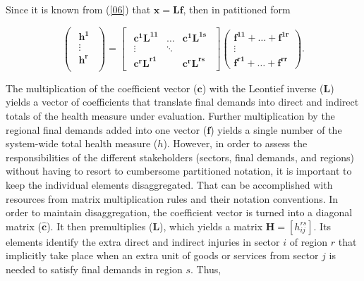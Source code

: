 \documentclass[a4paper,12pt, ]{article}
\begin{document}
\noindent Since it is known from (\ref{06}) that $\mathbf{x = Lf}$, then in patitioned form

\begin{equation} \begin{pmatrix} \begin{array}{c} \mathbf{h^1} \\ \vdots\\ \mathbf{h^r}\\ \end{array} \end{pmatrix} =
\begin{bmatrix} \begin{array}{ccc} \mathbf{c^1 L^{11}} & \ldots & \mathbf{c^1 L^{1s}} \\ \vdots &  \ddots &  \\ \mathbf{c^r L^{r1}}
&  & \mathbf{c^r L^{rs}} \end{array} \end{bmatrix} \left( \begin{array}{c} \mathbf{f^{11}} +  \ldots  +  \mathbf{f^{1r}} \\ \vdots 
\\ \mathbf{f^{r1}}  +  \ldots  +  \mathbf{f^{rr}} \end{array} \right). \label{09} 
\end{equation}

The multiplication of the coefficient vector ($\mathbf{c}$) with the Leontief inverse ($\mathbf{L}$) yields a vector of coefficients that translate final demands into direct and indirect totals of the health measure under evaluation. Further multiplication by the regional final demands added into one vector ($\mathbf{f}$) yields a single number of the system-wide total health measure ($h$). However, in order to assess the responsibilities of the different stakeholders (sectors, final demands, and regions) without having to resort to cumbersome partitioned notation, it is important to keep the individual elements disaggregated. That can be accomplished with resources from matrix multiplication rules and their notation conventions. In order to maintain disaggregation, the coefficient vector is turned into a diagonal matrix ($\mathbf{\hat{c}}$). It then premultiplies ($\mathbf{L}$), which yields a matrix $\mathbf{H}=[h^{rs}_{ij}]$. Its elements identify the extra direct and indirect injuries in sector $i$ of region $r$ that implicitly take place when an extra unit of goods or services from sector $j$ is needed to satisfy final demands
in region $s$. Thus,
\end{document}
